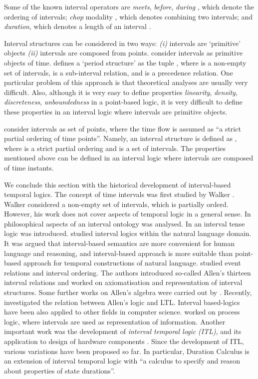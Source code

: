 \documentclass[11pt]{article}
\begin{document}
Some of the known interval operators are \emph{meets}, \emph{before}, \emph{during} \cite{All83}, which denote the ordering of intervals; \emph{chop} modality \cite{Ven91}, which denotes combining two intervals; and \emph{duration}, which denotes a length of an interval \cite{CH04}.

Interval structures can be considered in two ways: \emph{(i)} intervals are `primitive' objects \emph{(ii)} intervals are composed from points. \cite{vB91,MSV02,Vit05} consider intervals as primitive objects of time. \cite{vB91} defines  a `period structure' as the tuple , where  is a non-empty set of intervals,  is a sub-interval relation, and  is a precedence relation.
One particular problem of this approach is that theoretical analyses are usually very difficult. Also, although it is very easy to define properties  \emph{linearity}, \emph{density}, \emph{discreteness}, \emph{unboundedness} in a point-based logic, it is very difficult to define these properties in an interval logic where intervals are primitive objects. 

\cite{GMS04,HS91,Ven91} consider intervals as set of points, where the time flow is assumed as ``a strict partial ordering of time points''. Namely, an interval structure is defined as , where  is a strict partial ordering and  is a set of intervals. The properties mentioned above can be defined in an interval logic where intervals are composed of time instants. 

We conclude this section with the historical development of interval-based temporal logics. The concept of time intervals was first studied by Walker \cite{Wal47}. Walker considered a non-empty set of intervals, which is partially orderd. However, his work does not cover aspects of temporal logic in a general sense. In \cite{Ham71}  philosophical aspects of an interval ontology was analysed. In \cite{Hum79} an interval tense logic was introduced. 
 \cite{Dow79,Kam79,Rop80,Bur82,vB83,Gal84,Sim87} studied interval logics within the natural language domain. 
 It was argued that interval-based semantics are more convenient for human language and reasoning, and 
interval-based approach is more suitable than point-based approach for temporal constructions of natural language.
\cite{All83,All84,AH89,AF94} studied event relations and interval ordering. The authors introduced so-called Allen's thirteen interval relations and worked on axiomatisation and representation of interval structures.  Some further works on Allen's algebra were carried out by \cite{Lad87,Gal90}. Recently, \cite{RB06} investigated the relation between Allen's logic and LTL. Interval based-logics have been also applied to other fields in computer science. \cite{Par78,Pra79,HPS83} worked on process logic, where intervals are used as representation of information. Another important work was the development of \emph{interval temporal logic} \emph{(ITL)}, and its application to design of hardware components \cite{Mos83,HMM83}. Since the development of  ITL, various variations have been proposed so far. In particular, Duration Calculus \cite{CH04} is an extension of interval temporal logic with ``a calculus to specify and reason about properties of state durations''.
\end{document}
